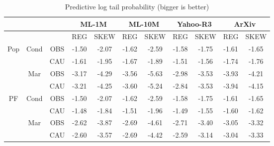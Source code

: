 \begin{table}

\begin{subtable}[t]{\textwidth}
\centering
\begin{tabular}{ c  c  c  c c  c c  c c  c c  }
  \toprule
  \multicolumn{3}{c}{} & \multicolumn{2}{c}{\textbf{ML-1M}} & \multicolumn{2}{c}{\textbf{ML-10M}} & \multicolumn{2}{c}{\textbf{Yahoo-R3}} & \multicolumn{2}{c}{\textbf{ArXiv}} \\ \midrule
  \multicolumn{2}{c}{} & & REG & SKEW & REG & SKEW  & REG & SKEW & REG & SKEW  \\ \midrule
  \multirow{4}{*}{Pop} & \multirow{2}{*}{Cond} & OBS & -1.50 & -2.07 & -1.62 & -2.59 & -1.58 & -1.75 & -1.61 & -1.65 \\
  & & CAU & -1.61 & -1.95 & -1.67 & -1.89 & -1.51 & -1.56 & -1.74 & -1.76 \\ \cmidrule{2-11}
  & \multirow{2}{*}{Mar} & OBS & -3.17 & -4.29 & -3.56 & -5.63 & -2.98 & -3.53 & -3.93 & -4.21 \\
  & & CAU & -3.21 & -4.25 & -3.60 & -5.24 & -2.84 & -3.53 & -3.94 & -4.15\\ \midrule
  \multirow{4}{*}{PF} & \multirow{2}{*}{Cond} & OBS & -1.50 & -2.07 & -1.62 & -2.59 & -1.58 & -1.75 & -1.61 & -1.65 \\
  & & CAU & -1.48 & -1.84 & -1.51 & -1.96 & -1.49 & -1.55 & -1.60 & -1.62 \\ \cmidrule{2-11}
  & \multirow{2}{*}{Mar} & OBS &-2.62 & -3.87 & -2.69 & -4.61 & -2.71 & -3.40 & -3.05 & -3.32 \\
  & & CAU & -2.60 & -3.57 & -2.69 & -4.42 & -2.59 & -3.14 & -3.04 & -3.33 \\ \bottomrule
\end{tabular}
\caption{Predictive log tail probability (bigger is better)}\hfill
\label{tab:eval_plp}


\end{subtable}
\end{table}
